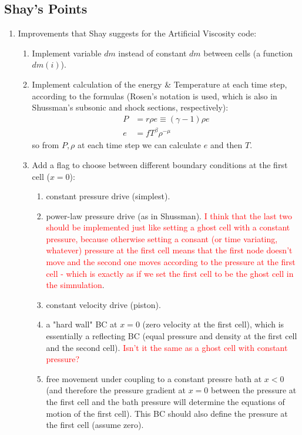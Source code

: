 \documentclass[11pt]{article}
\begin{document}
\subsection{Shay's Points}
\begin{enumerate}
    \item Improvements that Shay suggests for the Artificial Viscosity code:
    \begin{enumerate}
        \item Implement variable $dm$ instead of constant $dm$ between cells (a function $dm(i)$).
        \item Implement calculation of the energy \& Temperature at each time step, according to the formulas (Rosen's notation is used, which is also in Shussman's subsonic and shock sections, respectively):
        \begin{align}
            P &= r \rho e \equiv (\gamma - 1) \rho e \\
            e &= f T^\beta \rho^{-\mu}
        \end{align}
        so from $P,\rho$ at each time step we can calculate $e$ and then $T$.
        \item Add a flag to choose between different boundary conditions at the first cell ($x=0$):
        \begin{enumerate}
            \item constant pressure drive (simplest). 
            \item power-law pressure drive (as in Shussman).
            \textcolor{red}{I think that the last two should be implemented just like setting a ghost cell with a constant pressure, because otherwise setting a consant (or time variating, whatever) pressure at the first cell means that the first node doesn't move and the second one moves according to the pressure at the first cell - which is exactly as if we set the first cell to be the ghost cell in the simnulation}.
            \item constant velocity drive (piston).
            \item a "hard wall" BC at $x=0$ (zero velocity at the first cell), which is essentially a reflecting BC (equal pressure and density at the first cell and the second cell). \textcolor{red}{Isn't it the same as a ghost cell with constant pressure?}
            \item free movement under coupling to a constant pressre bath at $x < 0$ (and therefore the pressure gradient at $x=0$ between the pressure at the first cell and the bath pressure will determine the equations of motion of the first cell). This BC should also define the pressure at the first cell (assume zero).

\end{enumerate}
\end{enumerate}
\end{enumerate}
\end{document}
